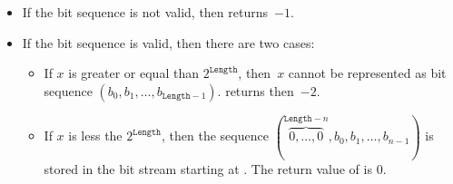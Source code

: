 \begin{itemize}
\item 
If the bit sequence is not valid, then \poke returns~$-1$.

\item 
If the bit sequence is valid, then there are two cases:

\begin{itemize}
\item
If $x$ is greater or equal than $2^\mathtt{Length}$, then~$x$
cannot be represented as bit sequence $(b_0, b_1,\ldots,b_{\mathtt{Length} - 1})$.
\poke returns then~$-2$.

\item
If $x$ is less the $2^{\mathtt{Length}}$, then  the sequence
$(\overbrace{0,\ldots,0}^{\mathtt{Length}-n},b_0, b_1,\ldots,b_{n - 1})$
is stored in the bit stream starting at .
The return value of \poke is 0.

\end{itemize}
\end{itemize}

